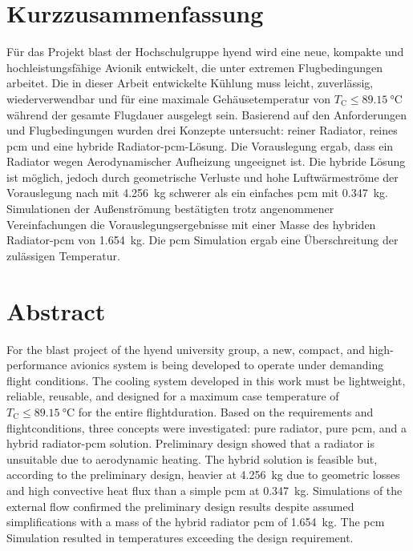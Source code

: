 \chapter*{Kurzzusammenfassung} %
\label{chap:Kurzzusammenfassung}


Für das Projekt \ac{blast} der Hochschulgruppe \ac{hyend} wird eine neue, kompakte und hochleistungsfähige Avionik entwickelt,
die unter extremen Flugbedingungen arbeitet. Die in dieser Arbeit entwickelte Kühlung muss leicht, zuverlässig, wiederverwendbar und für eine
maximale Gehäusetemperatur von $T_\mathrm{C} \leq \SI{89.15}{\celsius}$ während der gesamte Flugdauer ausgelegt sein.
Basierend auf den Anforderungen und Flugbedingungen
wurden drei Konzepte untersucht: reiner Radiator, reines \ac{pcm} und eine hybride Radiator-\ac{pcm}-Lösung. Die Vorauslegung
ergab, dass ein Radiator wegen Aerodynamischer Aufheizung ungeeignet ist. Die hybride Lösung ist möglich, jedoch durch geometrische
Verluste und hohe Luftwärmeströme der Vorauslegung nach mit \SI{4.256}{\kilogram} schwerer als ein einfaches \ac{pcm}
mit \SI{0.347}{\kilogram}. Simulationen der Außenströmung
bestätigten trotz angenommener Vereinfachungen die Vorauslegungsergebnisse mit einer Masse des hybriden Radiator-\ac{pcm} von \SI{1.654}{\kilogram}.
Die \ac{pcm} Simulation ergab eine Überschreitung der zulässigen Temperatur.

\chapter*{Abstract} %
\label{chap:Abstract}
For the \ac{blast} project of the \ac{hyend} university group, a new, compact, and high-performance avionics system is being developed to
operate under demanding flight conditions. The cooling system developed in this work must be lightweight, reliable, reusable, and designed for a maximum
case temperature of $T_\mathrm{C} \leq \SI{89.15}{\celsius}$ for the entire flightduration.
Based on the requirements and flightconditions, three concepts were investigated: pure radiator, pure \ac{pcm}, and a hybrid radiator-\ac{pcm}
solution. Preliminary design showed that a radiator is unsuitable due to aerodynamic heating. The hybrid solution is feasible but, according to
the preliminary design, heavier at \SI{4.256}{\kilogram} due to geometric losses and high convective heat flux than a simple \ac{pcm} at
\SI{0.347}{\kilogram}. Simulations of the external flow confirmed the preliminary design results despite assumed
simplifications with a mass of the hybrid radiator \ac{pcm} of \SI{1.654}{\kilogram}. The \ac{pcm} Simulation resulted in temperatures
exceeding the design requirement.
